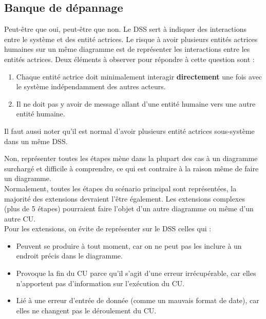 \subsection{Banque de dépannage}


Peut-être que oui, peut-être que non. Le \acrshort{DSS} sert à indiquer des interactions entre le système et des entité actrices. Le risque à avoir plusieurs entités actrices humaines sur un même diagramme est de représenter les interactions entre les entités actrices. Deux éléments à observer pour répondre à cette question sont :
\begin{enumerate}
	\item Chaque entité actrice doit minimalement interagir {\bfseries directement} une fois avec le système indépendamment des autres acteurs. 
	\item Il ne doit pas y avoir de message allant d'une entité humaine vers une autre entité humaine.
\end{enumerate}

Il faut aussi noter qu'il est normal d'avoir plusieurs entité actrices sous-système dans un même \acrshort{DSS}. \\


Non, représenter toutes les étapes mène dans la plupart des cas à un diagramme surchargé et difficile à comprendre, ce qui est contraire à la raison même de faire un diagramme.\\

Normalement, toutes les étapes du scénario principal sont représentées, la majorité des extensions devraient l'être également. Les extensions complexes (plus de 5 étapes) pourraient faire l'objet d'un autre diagramme ou même d'un autre \acrshort{CU}.\\

Pour les extensions, on évite de représenter sur le \acrshort{DSS} celles qui :
\begin{itemize}
	\item Peuvent se produire à tout moment, car on ne peut pas les inclure à un endroit précis dans le diagramme.
	\item Provoque la fin du CU parce qu'il s'agit d'une erreur irrécupérable, car elles n'apportent pas d'information sur l'exécution du CU.
	\item Lié à une erreur d'entrée de donnée (comme un mauvais format de date), car elles ne changent pas le déroulement du CU.
\end{itemize}



